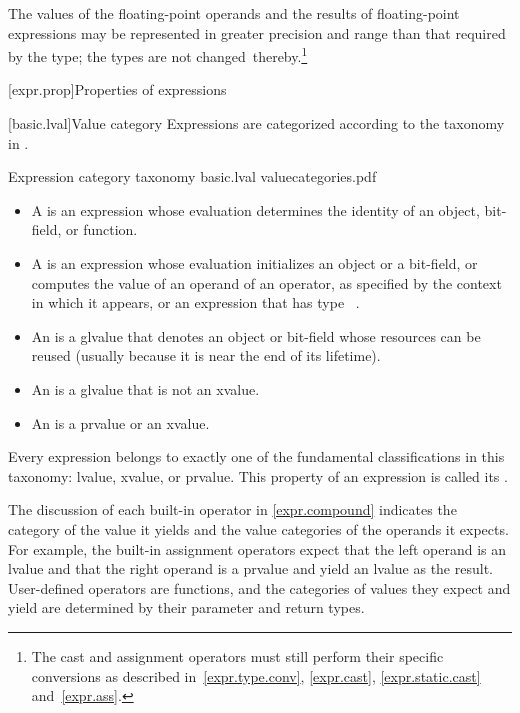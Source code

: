 \pnum
The values of the floating-point operands and
the results of floating-point expressions
may be represented in greater precision and range than that
required by the type; the types are not changed\
thereby.\footnote{The cast and assignment operators must still perform their specific
conversions as described in~\ref{expr.type.conv}, \ref{expr.cast},
\ref{expr.static.cast} and~\ref{expr.ass}.}

[expr.prop]{Properties of expressions}

[basic.lval]{Value category}
\pnum
Expressions are categorized according to the taxonomy in .

\begin{importgraphic}
{Expression category taxonomy}
{basic.lval}
{valuecategories.pdf}
\end{importgraphic}

\begin{itemize}
\item A  is an expression whose evaluation determines the identity of an object, bit-field, or function.
\item A \defn{prvalue} is an expression whose evaluation initializes an object or a bit-field,
or computes the value of an operand of an operator,
as specified by the context in which it appears,
or an expression that has type \cv{}~.
\item An  is a glvalue that denotes an object or bit-field whose resources can be reused (usually because it is near the end of its lifetime).
\item An \defn{lvalue} is a glvalue that is not an xvalue.
\item An  is a prvalue or an xvalue.
\end{itemize}

\pnum
Every expression belongs to exactly one of the fundamental classifications in this
taxonomy: lvalue, xvalue, or prvalue. This property of an expression is called
its \defn{value category}.
\begin{note}
The discussion of each built-in operator in
\ref{expr.compound} indicates the category of the value it yields and the value categories
of the operands it expects. For example, the built-in assignment operators expect that
the left operand is an lvalue and that the right operand is a prvalue and yield an
lvalue as the result. User-defined operators are functions, and the categories of
values they expect and yield are determined by their parameter and return types.
\end{note}

